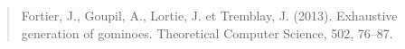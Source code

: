 \begin{introduction}
\begin{quote}Fortier, J., Goupil, A., Lortie, J. et Tremblay, J. (2013). Exhaustive generation of
gominoes. Theoretical Computer Science, 502, 76--87.
\end{quote}


\end{introduction}